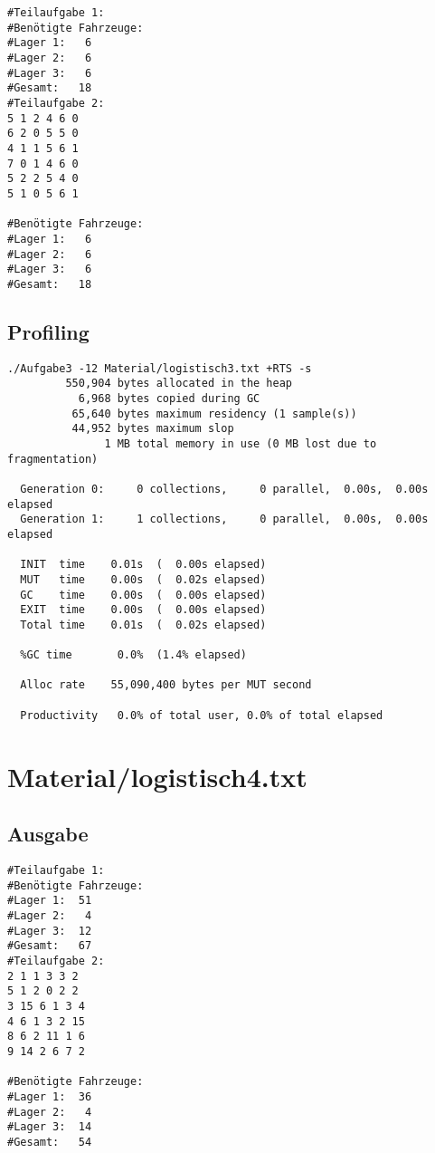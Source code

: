 \documentclass{scrreprt}
\begin{document}
\begin{verbatim}
#Teilaufgabe 1:
#Benötigte Fahrzeuge:
#Lager 1:   6
#Lager 2:   6
#Lager 3:   6
#Gesamt:   18
#Teilaufgabe 2:
5 1 2 4 6 0
6 2 0 5 5 0
4 1 1 5 6 1
7 0 1 4 6 0
5 2 2 5 4 0
5 1 0 5 6 1

#Benötigte Fahrzeuge:
#Lager 1:   6
#Lager 2:   6
#Lager 3:   6
#Gesamt:   18
\end{verbatim}

\subsection*{Profiling}

\begin{verbatim}
./Aufgabe3 -12 Material/logistisch3.txt +RTS -s 
         550,904 bytes allocated in the heap
           6,968 bytes copied during GC
          65,640 bytes maximum residency (1 sample(s))
          44,952 bytes maximum slop
               1 MB total memory in use (0 MB lost due to fragmentation)

  Generation 0:     0 collections,     0 parallel,  0.00s,  0.00s elapsed
  Generation 1:     1 collections,     0 parallel,  0.00s,  0.00s elapsed

  INIT  time    0.01s  (  0.00s elapsed)
  MUT   time    0.00s  (  0.02s elapsed)
  GC    time    0.00s  (  0.00s elapsed)
  EXIT  time    0.00s  (  0.00s elapsed)
  Total time    0.01s  (  0.02s elapsed)

  %GC time       0.0%  (1.4% elapsed)

  Alloc rate    55,090,400 bytes per MUT second

  Productivity   0.0% of total user, 0.0% of total elapsed
\end{verbatim}


\section{Material/logistisch4.txt}

\subsection*{Ausgabe}

\begin{verbatim}
#Teilaufgabe 1:
#Benötigte Fahrzeuge:
#Lager 1:  51
#Lager 2:   4
#Lager 3:  12
#Gesamt:   67
#Teilaufgabe 2:
2 1 1 3 3 2
5 1 2 0 2 2
3 15 6 1 3 4
4 6 1 3 2 15
8 6 2 11 1 6
9 14 2 6 7 2

#Benötigte Fahrzeuge:
#Lager 1:  36
#Lager 2:   4
#Lager 3:  14
#Gesamt:   54
\end{verbatim}
\end{document}
